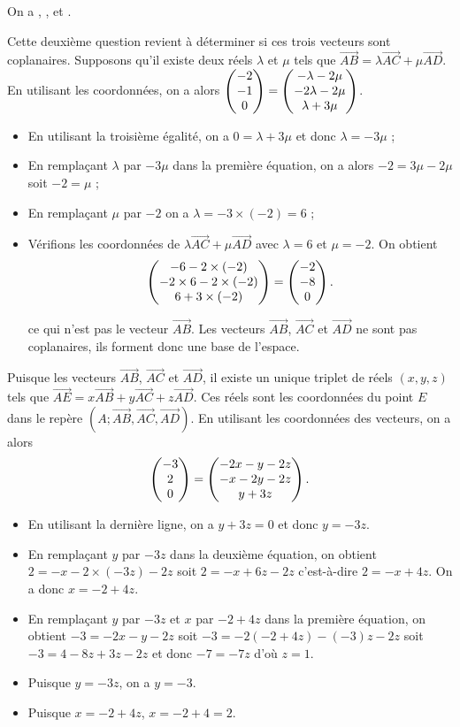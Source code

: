 \documentclass[11pt,fleqn, openany]{book} %
\begin{document}
\begin{solution}On a  , ,  et .

Cette deuxième question revient à déterminer si ces trois vecteurs sont coplanaires. Supposons qu'il existe deux réels $\lambda$ et $\mu$ tels que $\overrightarrow{AB}=\lambda \overrightarrow{AC}+\mu \overrightarrow{AD}$. En utilisant les coordonnées, on a alors $\coordbe{-2}{-1}{0}=\coordbe{-\lambda-2\mu}{-2\lambda-2\mu}{\lambda+3\mu}$.

\begin{itemize}
\item En utilisant la troisième égalité, on a $0=\lambda+3\mu$ et donc $\lambda=-3\mu$ ;
\item En remplaçant $\lambda$ par $-3\mu$ dans la première équation, on a alors $-2=3\mu-2\mu$ soit $-2=\mu$ ;
\item En remplaçant $\mu$ par $-2$ on a $\lambda = -3\times(-2)=6$ ;
\item Vérifions les coordonnées de $\lambda \overrightarrow{AC}+\mu \overrightarrow{AD}$ avec $\lambda=6$ et $\mu=-2$. On obtient
\[\coordbe{-6-2\times(-2)}{-2\times 6-2 \times (-2)}{6+3\times (-2)}=\coordbe{-2}{-8}{0}.\]

ce qui n'est pas le vecteur $\overrightarrow{AB}$. Les vecteurs $\overrightarrow{AB}$, $\overrightarrow{AC}$ et $\overrightarrow{AD}$ ne sont pas coplanaires, ils forment donc une base de l'espace.\end{itemize}

Puisque les vecteurs $\overrightarrow{AB}$, $\overrightarrow{AC}$ et $\overrightarrow{AD}$, il existe un unique triplet de réels $(x,y,z)$ tels que $\overrightarrow{AE}= x \overrightarrow{AB}+y \overrightarrow{AC}+z \overrightarrow{AD}$. Ces réels sont les coordonnées du point $E$ dans le repère $(A;\overrightarrow{AB},\overrightarrow{AC},\overrightarrow{AD})$. En utilisant les coordonnées des vecteurs, on a alors
\[ \coordbe{-3}{2}{0} = \coordbe{-2x-y-2z}{-x-2y-2z}{y+3z}.\]

\begin{itemize}
\item En utilisant la dernière ligne, on a $y+3z=0$ et donc $y=-3z$.
\item En remplaçant $y$ par $-3z$ dans la deuxième équation, on  obtient $2=-x-2\times(-3z)-2z$ soit $2=-x+6z-2z$ c'est-à-dire $2=-x+4z$. On a donc $x=-2+4z$.
\item En remplaçant $y$ par $-3z$ et $x$ par $-2+4z$ dans la première équation, on obtient $-3=-2x-y-2z$ soit $-3=-2(-2+4z)-(-3)z-2z$ soit $-3=4-8z+3z-2z$ et donc $-7=-7z$ d'où $z=1$.
\item Puisque $y=-3z$, on a $y=-3$.
\item Puisque $x=-2+4z$, $x=-2+4=2$.
\end{itemize}



\end{solution}
\end{document}
